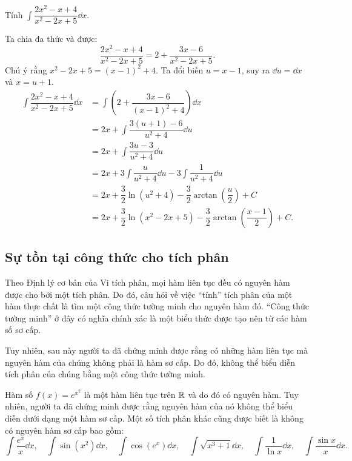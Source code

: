 \begin{example}
    Tính $\int \dfrac{2x^2-x+4}{x^2-2x+5} \dd x$.
\end{example}
\begin{solution}
    Ta chia đa thức và được:
    \[
        \dfrac{2x^2-x+4}{x^2-2x+5} = 2 + \dfrac{3x-6}{x^2-2x+5}.
    \]
    Chú ý rằng $x^2-2x+5 = (x-1)^2+4$. Ta đổi biến $u=x-1$, suy ra $\dd u = \dd x$ và $x=u+1$.
    \begin{align*}
        \int \dfrac{2x^2-x+4}{x^2-2x+5} \dd x &= \int \left( 2 + \dfrac{3x-6}{(x-1)^2+4} \right) \dd x \\
        &= 2x + \int \dfrac{3(u+1)-6}{u^2+4} \dd u \\
        &= 2x + \int \dfrac{3u-3}{u^2+4} \dd u \\
        &= 2x + 3\int \dfrac{u}{u^2+4} \dd u - 3\int \dfrac{1}{u^2+4} \dd u \\
        &= 2x + \dfrac{3}{2}\ln(u^2+4) - \dfrac{3}{2}\arctan\left(\dfrac{u}{2}\right) + C \\
        &= 2x + \dfrac{3}{2}\ln(x^2-2x+5) - \dfrac{3}{2}\arctan\left(\dfrac{x-1}{2}\right) + C.
    \end{align*}
\end{solution}

\subsection{Sự tồn tại công thức cho tích phân}

Theo Định lý cơ bản của Vi tích phân, mọi hàm liên tục đều có nguyên hàm được cho bởi một tích phân. Do đó, câu hỏi về việc ``tính'' tích phân của một hàm thực chất là tìm một công thức tường minh cho nguyên hàm đó. ``Công thức tường minh'' ở đây có nghĩa chính xác là một biểu thức được tạo nên từ các hàm số sơ cấp.

Tuy nhiên, sau này người ta đã chứng minh được rằng có những hàm liên tục mà nguyên hàm của chúng không phải là hàm sơ cấp. Do đó, không thể biểu diễn tích phân của chúng bằng một công thức tường minh.

\begin{example}
    Hàm số $f(x) = e^{x^2}$ là một hàm liên tục trên $\mathbb{R}$ và do đó có nguyên hàm. Tuy nhiên, người ta đã chứng minh được rằng nguyên hàm của nó không thể biểu diễn dưới dạng một hàm sơ cấp. Một số tích phân khác cũng được biết là không có nguyên hàm sơ cấp bao gồm:
    \[ \int \dfrac{e^x}{x}\dd x, \quad \int \sin(x^2)\dd x, \quad \int \cos(e^x)\dd x, \quad \int \sqrt{x^3+1}\dd x, \quad \int \dfrac{1}{\ln x}\dd x, \quad \int \dfrac{\sin x}{x}\dd x. \]
\end{example}

